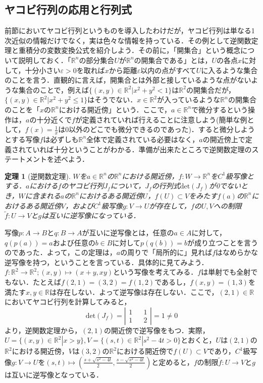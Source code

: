 \documentclass{jsarticle}
\def\detb{\left|\begin{matrix}}
\def\dete{\end{matrix}\right|}
\def\realnum{{\mathbb R}}
\def\det{{\mathrm{det}}}
\newtheorem{theo}{定理}
\begin{document}
\subsection{ヤコビ行列の応用と行列式}
前節においてヤコビ行列というものを導入したわけだが，ヤコビ行列は単なる1次近似の情報だけでなく，実は色々な情報を持っている．その例として逆関数定理と重積分の変数変換公式を紹介しよう．その前に，「開集合」という概念について説明しておく．「$\realnum^n$の部分集合$U$が$\realnum^n$の開集合である」とは，$U$の各点$x$に対して，十分小さい$\varepsilon>0$を取れば$x$から距離$\varepsilon$以内の点がすべて$U$に入るような集合のことを言う．直観的に言えば，開集合とは外部と接しているような点がないような集合のことで，例えば$\{(x,y)\in\realnum^2|x^2+y^2<1\}$は$\realnum^2$の開集合だが，$\{(x,y)\in\realnum^2|x^2+y^2\le1\}$はそうでない．$x\in\realnum^2$が入っているような$\realnum^n$の開集合のことを「$x$の$\realnum^n$における開近傍」という．ここで，$a\in\realnum^n$で微分するという操作は，$a$の十分近くで$f$が定義されていれば行えることに注意しよう(簡単な例として，$f(x)=\frac{1}{x}$は0以外のどこでも微分できるのであった)．すると微分しようとする写像$f$は必ずしも$\realnum^n$全体で定義されている必要はなく，$a$の開近傍上で定義されていれば十分ということがわかる．準備が出来たところで逆関数定理のステートメントを述べよう．
\begin{theo}[逆関数定理]
$W$を$a\in\realnum^n$の$\realnum^n$における開近傍，$f:W\rightarrow\realnum^n$を$C^1$級写像とする．$a$における$f$のヤコビ行列$J_f$について，$J_f$の行列式$\det(J_f)$が0でないとき，$W$に含まれる$a$の$\realnum^n$におけるある開近傍$U$，$f(U)\subset V$をみたす$f(a)$の$\realnum^n$におけるある開近傍$V$，および$C^1$級写像$g:V\rightarrow U$が存在して，$f$の$U,V$への制限$\tilde{f}:U\rightarrow V$と$g$は互いに逆写像になっている．
\end{theo}
写像$p:A\rightarrow B$と$q:B\rightarrow A$が互いに逆写像とは，任意の$a\in A$に対して，$q(p(a))=a$および任意の$b\in B$に対して$p(q(b))=b$が成り立つことを言うのであった．よって，この定理は，$a$の周りで「局所的に」見れば$f$はなめらかな逆写像を持つ，ということを言っている．具体的に見てみよう．$f:\realnum^2\rightarrow\realnum^2;(x,y)\mapsto(x+y,xy)$という写像を考えてみる．$f$は単射でも全射でもない．たとえば$f(2,1)=(3,2)=f(1,2)$であるし，$f(x,y)=(1,3)$を満たす$x,y\in\realnum$は存在しない．よって逆写像は存在しない．ここで，$(2,1)\in\realnum$においてヤコビ行列を計算してみると，
$$
\det(J_f)=\detb 1 && 1 \\ 1&& 2 \dete = 1\neq 0
$$
より，逆関数定理から，$(2,1)$の開近傍で逆写像をもつ．実際，$U=\{(x,y)\in\realnum^2|x>y\},V=\{(s,t)\in\realnum^2|s^2-4t>0\}$とおくと，$U$は$(2,1)$の$\realnum^2$における開近傍，$V$は$(3,2)$の$\realnum^2$における開近傍で$f(U)\subset V$であり，$C^1$級写像$g:V\rightarrow U$を$(s,t)\mapsto(\frac{s+\sqrt{s^2-4t}}{2},\frac{s-\sqrt{s^2-4t}}{2})$と定めると，$f$の制限$\tilde{f}:U\rightarrow V$と$g$は互いに逆写像となっている．
\end{document}
